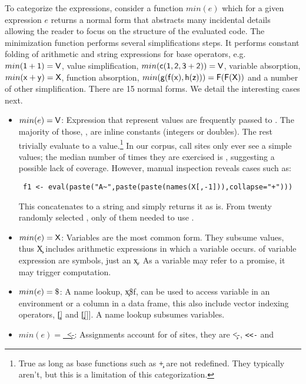 \documentclass[screen,acmsmall]{acmart}
\begin{document}
To categorize the expressions, consider a function $min(e)$ which for a given
expression $e$ returns a normal form that abstracts many incidental details
allowing the reader to focus on the structure of the evaluated code. The
minimization function performs several simplifications steps. It performs
constant folding of arithmetic and string expressions for base operators, e.g.
$min({\sf 1+1})={\sf V}$, value simplification, $min({\sf c(1,2,3+2)})={\sf V}$,
variable absorption, $min({\sf x+y})={\sf X}$, function absorption,
$min({\sf g(f(x),h(z))})={\sf F(F(X))}$ and a number of other simplification. There
are 15 normal forms. We detail the interesting cases next.

\begin{itemize}
\item \underline{$min(e)={\sf V}$}: Expression that represent values are
  frequently passed to \eval. The majority of those, \packageValOneNodePercent,
  are inline constants (integers or doubles). The rest trivially evaluate to a
  value.\footnote{True as long as base functions such as \c{+} are not
  redefined. They typically aren't, but this is a limitation of this
  categorization.} In our corpus, \packageNbCallSitesUniqueActualValue call
  sites only ever see a simple values; the median number of times they are
  exercised is \packageMedianRunSitesUniqueActualValue, suggesting a possible
  lack of coverage. However, manual inspection reveals cases such as:
\begin{lstlisting}
 f1 <- eval(paste("A~",paste(paste(names(X[,-1])),collapse="+")))
\end{lstlisting}
  This concatenates to a string and \eval simply returns it as is.
  From twenty randomly selected \evals, only \packageUsefulValueEvalPercent of
  them needed to use \eval.
\item \underline{$min(e)={\sf X}$}: Variables are the most common form. They
  subsume values, thus \c{X} includes arithmetic expressions in which a variable
  occurs. \packageNbSymbolVarSitePercent of variable expression are symbols, \ie
  just an \c{x}. As a variable may refer to a promise, it may trigger
  computation.
\item \underline{$min(e)={\sf \$}$}: A name lookup, \c{x\$f}, can be used to
  access variable in an environment or a column in a data frame, this also
  include vector   indexing operators, \c{[]} and \c{[[]]}. A name lookup
  subsumes variables.
\item \underline{$min(e)=$~\c{<-}}: Assignments account for
  \packageAssignSitesPercent of \eval sites, they are \c{<-}, {\tt <<-} and

\end{itemize}
\end{document}
